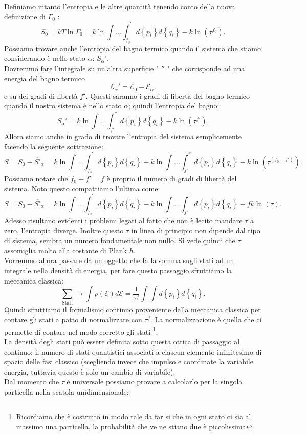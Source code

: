 Definiamo intanto l'entropia e le altre quantità tenendo conto della nuova definizione di $\Gamma_0$ :
\[
	S_0 = kT \ln\Gamma_0 = k\ln \int\ldots\int_{f_0}^{'} d\left\{ p_{i} \right\} d\left\{ q_{i} \right\} - k \ln \left( \tau^{f_0} \right) 
.\] 
Possiamo trovare anche l'entropia del bagno termico quando il sistema che stiamo considerando è nello stato $\alpha$: $S_{\alpha}'$. \\
Dovremmo fare l'integrale su un'altra superficie " $''$ " che corrisponde ad una energia del bagno termico 
\[
	\mathcal{E}_{\alpha}' = \mathcal{E}_0 - \mathcal{E}_{\alpha}
.\]
e su dei gradi di libertà $f'$. Questi saranno i gradi di libertà del bagno termico quando il nostro sistema è nello stato $\alpha$; quindi l'entropia del bagno:
\[
	S_{\alpha}' = k\ln \int\ldots\int_{f'}^{''}d\left\{ p_{i} \right\} d\left\{ q_{i} \right\} - k \ln \left( \tau^{f'} \right) 
.\] 
Allora siamo anche in grado di trovare l'entropia del sistema semplicemente facendo la seguente sottrazione:
\[
	S = S_0- \overline{S'}_{\alpha}= k \ln \int\ldots\int_{f_0}^{'}d\left\{ p_{i} \right\} d\left\{ q_{i} \right\} - k\ln \int\ldots\int_{f'}^{''}d\left\{ p_{i} \right\} d \left\{ q_i \right\} - k \ln \left( \tau^{\left( f_0-f' \right) } \right)
.\] 
Possiamo notare che $f_0- f' = f$ è proprio il numero di gradi di libertà del sistema. Noto questo compattiamo l'ultima come:
\[
	S = S_0- \overline{S'}_{\alpha}= k \ln \int\ldots\int_{f_0}^{'}d\left\{ p_{i} \right\} d\left\{ q_{i} \right\} - k\ln \int\ldots\int_{f'}^{''}d\left\{ p_{i} \right\} d \left\{ q_i \right\} - fk\ln\left( \tau \right) \label{eq:entropia1}
.\] 
Adesso risultano evidenti i problemi legati al fatto che non è lecito mandare  $\tau$ a zero, l'entropia diverge. Inoltre questo $\tau$ in linea di principio non dipende dal tipo di sistema, sembra un numero fondamentale non nullo. Si vede quindi che $\tau$ assomiglia molto alla costante di Plank $h$. \\
Vorremmo allora passare da un oggetto che fa la somma sugli stati ad un integrale nella densità di energia, per fare questo passaggio sfruttiamo la meccanica classica:
\[
	\sum_{\text{Stati}}^{} \longrightarrow \int \rho \left( \mathcal{E} \right) d\mathcal{E}=
	\frac{1}{\tau^{f}}\int\int d\left\{ p_{i} \right\} d\left\{ q_{i} \right\} 
.\] 
Quindi sfruttiamo il formalismo continuo proveniente dalla meccanica classica per contare gli stati a patto di normalizzare con $\tau^{f}$. La normalizzazione è quella che ci permette di contare nel modo corretto gli stati \footnote{Ricordiamo che è costruito in modo tale da far si che in ogni stato ci sia al massimo una particella, la probabilità che ve ne stiano due è piccolissima}. \\
La densità degli stati può essere definita sotto questa ottica di passaggio al continuo: il numero di stati quantistici associati a ciascun elemento infinitesimo di spazio delle fasi classico (scegliendo invece che impulso e coordinate la variabile energia, tuttavia questo è solo un cambio di variabile).\\
Dal momento che $\tau$ è universale possiamo provare a calcolarlo per la singola particella nella scatola unidimensionale:

